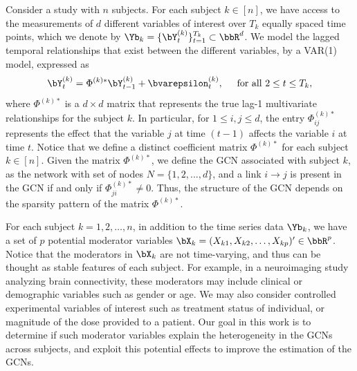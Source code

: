 Consider a study with $n$ subjects. For each subject $k\in[n]$, we have access to the measurements of $d$ different variables of interest over $T_k$ equally spaced time points, which we denote by $\Yb_{k} = \{ \bY_{t}^{(k)} \}_{t = 1}^{T_k}\subset \bbR^{d}$. We model the lagged temporal relationships that exist between the different variables, by a VAR(1) model, expressed as
\begin{equation*}
	\bY_{t}^{(k)} =  \Phi^{(k)*} \bY_{t-1}^{(k)} + \bvarepsilon_{t}^{(k)}, \hspace{5mm} \text{for all } 2\leq t\leq T_k,
\end{equation*}
where $\Phi^{(k)*}$ is a $d\times d$ matrix that represents the true lag-1 multivariate relationships for the subject $k$. In particular, for $1\leq i,j\leq d$, the entry $\Phi^{(k)*}_{ij}$ represents the effect that the variable $j$ at time $(t-1)$ affects the variable $i$ at time $t$. Notice that we define a distinct coefficient matrix $\Phi^{(k)*}$ for each subject $k\in[n]$. Given the matrix $\Phi^{(k)*}$, we define the GCN associated with subject $k$, as the network with set of nodes $N = \{1,2,...,d\}$, and a link $i\to j$ is present in the GCN if and only if $\Phi^{(k)*}_{ji}\neq 0$. Thus, the structure of the GCN depends on the sparsity pattern of the matrix $\Phi^{(k)*}$. 

For each subject $k=1,2,\ldots, n$, in addition to the time series data $\Yb_k$, we have a set of $p$ potential moderator variables $\bX_k = (X_{k1}, X_{k2}, \ldots, X_{kp})'\in\bbR^{p}$. Notice that the moderators in $\bX_k$ are not time-varying, and thus can be thought as stable features of each subject. For example, in a neuroimaging study analyzing brain connectivity, these moderators may include clinical or demographic variables such as gender or age. We may also consider controlled experimental variables of interest such as treatment status of individual, or magnitude of the dose provided to a patient. Our goal in this work is to determine if such moderator variables explain the heterogeneity in the GCNs across subjects, and exploit this potential effects to improve the estimation of the GCNs. 



